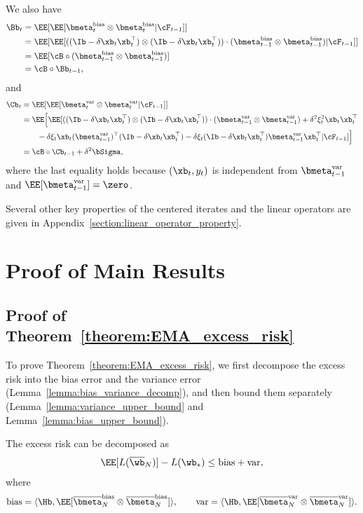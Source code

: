 \documentclass[11pt]{article}
\newcommand{\owb}{\overline{\wb}}
\newcommand{\obmeta}{\overline{\bmeta}}
\begin{document}
We also have
\begin{align}
\Bb_t&=\EE[\EE[\bmeta_t^{\mathrm{bias}}\otimes\bmeta_t^{\mathrm{bias}}|\cF_{t-1}]]\nonumber\\
&=\EE[\EE[((\Ib-\delta\xb_t\xb_t^\top)\otimes(\Ib-\delta\xb_t\xb_t^\top))\cdot(\bmeta_{t-1}^{\mathrm{bias}}\otimes\bmeta_{t-1}^{\mathrm{bias}})|\cF_{t-1}]]\nonumber\\
&=\EE[\cB\circ(\bmeta_{t-1}^{\mathrm{bias}}\otimes\bmeta_{t-1}^{\mathrm{bias}})]\nonumber\\
&=\cB\circ\Bb_{t-1},\label{eq:iterate_Bt}
\end{align}
and
\begin{align}
\Cb_t&=\EE[\EE[\bmeta_t^{\mathrm{var}}\otimes\bmeta_t^{\mathrm{var}}|\cF_{t-1}]]\nonumber\\
&=\EE\Big[\EE[((\Ib-\delta\xb_t\xb_t^\top)\otimes(\Ib-\delta\xb_t\xb_t^\top))\cdot(\bmeta_{t-1}^{\mathrm{var}}\otimes\bmeta_{t-1}^{\mathrm{var}})+\delta^2\xi_t^2\xb_t\xb_t^\top\nonumber\\
&\qquad-\delta\xi_t\xb_t(\bmeta_{t-1}^{\mathrm{var}})^\top(\Ib-\delta\xb_t\xb_t^\top)-\delta\xi_t(\Ib-\delta\xb_t\xb_t^\top)\bmeta_{t-1}^{\mathrm{var}}\xb_t^\top|\cF_{t-1}]\Big]\nonumber\\
&=\cB\circ\Cb_{t-1}+\delta^2\bSigma,
\end{align}
where the last equality holds because $(\xb_t, y_t)$ is independent from $\bmeta_{t-1}^{\mathrm{var}}$ and $\EE[\bmeta_{t-1}^{\mathrm{var}}]=\zero$.

Several other key properties of the centered iterates and the linear operators are given in Appendix~\ref{section:linear_operator_property}.

\section{Proof of Main Results}\label{section:proof_main}

\subsection{Proof of Theorem~\ref{theorem:EMA_excess_risk}}\label{subsection:proof_EMA_excess_risk}
To prove Theorem~\ref{theorem:EMA_excess_risk}, we first decompose the excess risk into the bias error and the variance error (Lemma~\ref{lemma:bias_variance_decomp}), and then bound them separately (Lemma~\ref{lemma:variance_upper_bound} and Lemma~\ref{lemma:bias_upper_bound}).
\begin{lemma}\label{lemma:bias_variance_decomp}
The excess risk can be decomposed as
\begin{align*}
\EE[L(\owb_N)]-L(\wb_*)\le\mathrm{bias}+\mathrm{var},
\end{align*}
where
\begin{align*}
\mathrm{bias}=\langle\Hb, \EE[\obmeta_N^{\mathrm{bias}}\otimes\obmeta_N^{\mathrm{bias}}]\rangle,\qquad\mathrm{var}=\langle\Hb, \EE[\obmeta_N^{\mathrm{var}}\otimes\obmeta_N^{\mathrm{var}}]\rangle.
\end{align*}
\end{lemma}
\end{document}
